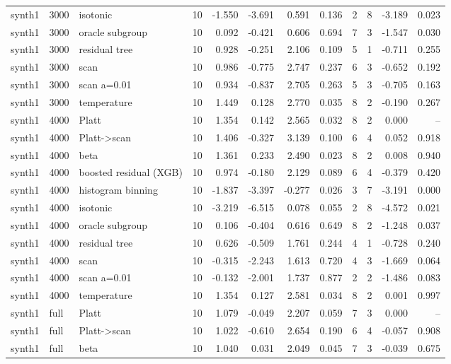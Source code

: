 \begin{tabular}{lllrrrrrrrrr}
synth1 & 3000 & isotonic & 10 & -1.550 & -3.691 & 0.591 & 0.136 & 2 & 8 & -3.189 & 0.023 \\
synth1 & 3000 & oracle subgroup & 10 & 0.092 & -0.421 & 0.606 & 0.694 & 7 & 3 & -1.547 & 0.030 \\
synth1 & 3000 & residual tree & 10 & 0.928 & -0.251 & 2.106 & 0.109 & 5 & 1 & -0.711 & 0.255 \\
synth1 & 3000 & scan & 10 & 0.986 & -0.775 & 2.747 & 0.237 & 6 & 3 & -0.652 & 0.192 \\
synth1 & 3000 & scan a=0.01 & 10 & 0.934 & -0.837 & 2.705 & 0.263 & 5 & 3 & -0.705 & 0.163 \\
synth1 & 3000 & temperature & 10 & 1.449 & 0.128 & 2.770 & 0.035 & 8 & 2 & -0.190 & 0.267 \\
synth1 & 4000 & Platt & 10 & 1.354 & 0.142 & 2.565 & 0.032 & 8 & 2 & 0.000 & -- \\
synth1 & 4000 & Platt->scan & 10 & 1.406 & -0.327 & 3.139 & 0.100 & 6 & 4 & 0.052 & 0.918 \\
synth1 & 4000 & beta & 10 & 1.361 & 0.233 & 2.490 & 0.023 & 8 & 2 & 0.008 & 0.940 \\
synth1 & 4000 & boosted residual (XGB) & 10 & 0.974 & -0.180 & 2.129 & 0.089 & 6 & 4 & -0.379 & 0.420 \\
synth1 & 4000 & histogram binning & 10 & -1.837 & -3.397 & -0.277 & 0.026 & 3 & 7 & -3.191 & 0.000 \\
synth1 & 4000 & isotonic & 10 & -3.219 & -6.515 & 0.078 & 0.055 & 2 & 8 & -4.572 & 0.021 \\
synth1 & 4000 & oracle subgroup & 10 & 0.106 & -0.404 & 0.616 & 0.649 & 8 & 2 & -1.248 & 0.037 \\
synth1 & 4000 & residual tree & 10 & 0.626 & -0.509 & 1.761 & 0.244 & 4 & 1 & -0.728 & 0.240 \\
synth1 & 4000 & scan & 10 & -0.315 & -2.243 & 1.613 & 0.720 & 4 & 3 & -1.669 & 0.064 \\
synth1 & 4000 & scan a=0.01 & 10 & -0.132 & -2.001 & 1.737 & 0.877 & 2 & 2 & -1.486 & 0.083 \\
synth1 & 4000 & temperature & 10 & 1.354 & 0.127 & 2.581 & 0.034 & 8 & 2 & 0.001 & 0.997 \\
synth1 & full & Platt & 10 & 1.079 & -0.049 & 2.207 & 0.059 & 7 & 3 & 0.000 & -- \\
synth1 & full & Platt->scan & 10 & 1.022 & -0.610 & 2.654 & 0.190 & 6 & 4 & -0.057 & 0.908 \\
synth1 & full & beta & 10 & 1.040 & 0.031 & 2.049 & 0.045 & 7 & 3 & -0.039 & 0.675 \\

\end{tabular}

